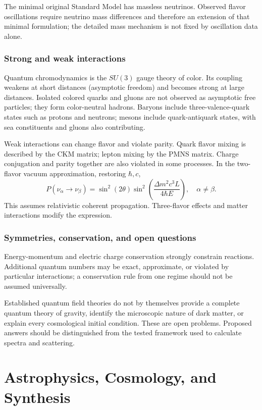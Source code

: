 \documentclass[11pt,oneside]{book}
\theoremstyle{reviewstyle}
\begin{document}
The minimal original Standard Model has massless neutrinos. Observed flavor oscillations require neutrino mass differences and therefore an extension of that minimal formulation; the detailed mass mechanism is not fixed by oscillation data alone.
\section{Strong and weak interactions}
Quantum chromodynamics is the $SU(3)$ gauge theory of color. Its coupling weakens at short distances (asymptotic freedom) and becomes strong at large distances. Isolated colored quarks and gluons are not observed as asymptotic free particles; they form color-neutral hadrons. Baryons include three-valence-quark states such as protons and neutrons; mesons include quark-antiquark states, with sea constituents and gluons also contributing.

Weak interactions can change flavor and violate parity. Quark flavor mixing is described by the CKM matrix; lepton mixing by the PMNS matrix. Charge conjugation and parity together are also violated in some processes. In the two-flavor vacuum approximation, restoring $\hbar,c$,
\begin{equation}P(\nu_\alpha\to\nu_\beta)=\sin^2(2\theta)\sin^2\left(\frac{\Delta m^2c^3L}{4\hbar E}\right),\quad \alpha\neq\beta.\end{equation}
This assumes relativistic coherent propagation. Three-flavor effects and matter interactions modify the expression.
\section{Symmetries, conservation, and open questions}
Energy-momentum and electric charge conservation strongly constrain reactions. Additional quantum numbers may be exact, approximate, or violated by particular interactions; a conservation rule from one regime should not be assumed universally.

Established quantum field theories do not by themselves provide a complete quantum theory of gravity, identify the microscopic nature of dark matter, or explain every cosmological initial condition. These are open problems. Proposed answers should be distinguished from the tested framework used to calculate spectra and scattering.

\part{Astrophysics, Cosmology, and Synthesis}
\end{document}
